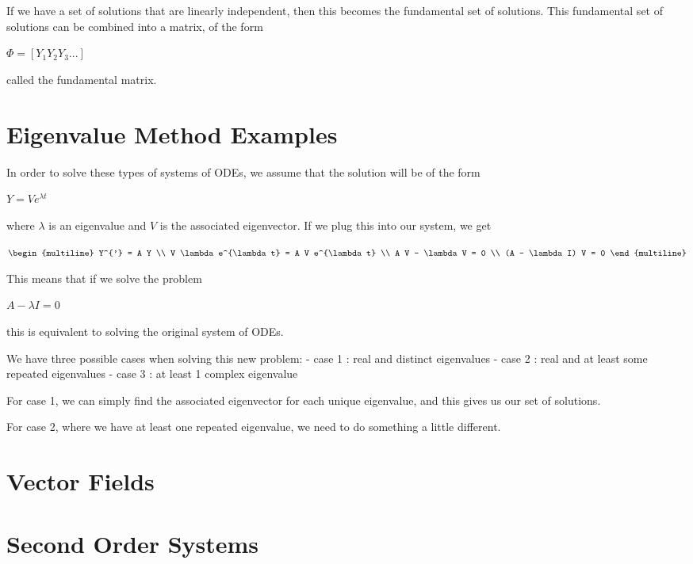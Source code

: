 \documentclass[
  letterpaper,
]{report}
\begin{document}
If we have a set of solutions that are linearly independent, then this
becomes the fundamental set of solutions. This fundamental set of
solutions can be combined into a matrix, of the form

\(\Phi = [ Y_1 Y_2 Y_3 ...]\)

called the fundamental matrix.

\section{Eigenvalue Method Examples}\label{eigenvalue-method-examples}

In order to solve these types of systems of ODEs, we assume that the
solution will be of the form

\(Y = V e^{\lambda t}\)

where \(\lambda\) is an eigenvalue and \(V\) is the associated
eigenvector. If we plug this into our system, we get

\(\begin{multiline}
Y^{'} = A Y \\
V \lambda e^{\lambda t} = A V e^{\lambda t} \\
A V - \lambda V = 0 \\
(A - \lambda I) V = 0
\end{multiline}\)

This means that if we solve the problem

\(A - \lambda I = 0\)

this is equivalent to solving the original system of ODEs.

We have three possible cases when solving this new problem: - case 1 :
real and distinct eigenvalues - case 2 : real and at least some repeated
eigenvalues - case 3 : at least 1 complex eigenvalue

For case 1, we can simply find the associated eigenvector for each
unique eigenvalue, and this gives us our set of solutions.

For case 2, where we have at least one repeated eigenvalue, we need to
do something a little different.

\section{Vector Fields}\label{vector-fields}

\section{Second Order Systems}\label{second-order-systems}
\end{document}
